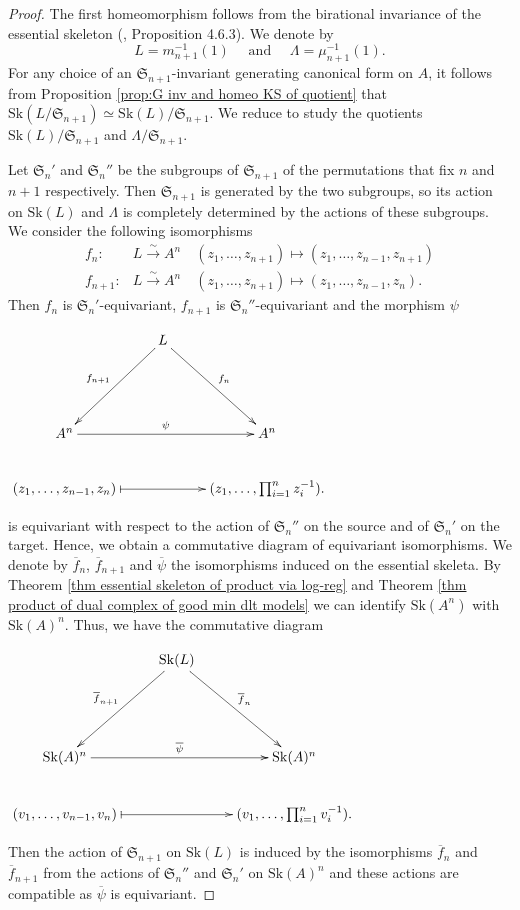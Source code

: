 \documentclass{amsart}%
\numberwithin{equation}{subsection}
\theoremstyle{plain2}
\theoremstyle{definition2}
\theoremstyle{stepstyle}
\theoremstyle{point}
\theoremstyle{subpoint}
\newcommand{\Sk}{\mathrm{Sk}}
\begin{document}
\begin{proof}
The first homeomorphism follows from the birational invariance of the essential skeleton (\cite{MustataNicaise}, Proposition 4.6.3). We denote by $$L=m_{n+1}^{-1}(1) \quad \text{ and }\quad \Lambda=\mu_{n+1}^{-1}(1).$$ For any choice of an $\mathfrak{S}_{n+1}$-invariant generating canonical form on $A$, it follows from Proposition \ref{prop:G inv and homeo KS of quotient} that $\Sk(L/\mathfrak{S}_{n+1}) \simeq \Sk(L)/\mathfrak{S}_{n+1}$. We reduce to study the quotients $\Sk(L)/\mathfrak{S}_{n+1}$ and $\Lambda/\mathfrak{S}_{n+1}$.

Let $\mathfrak{S}_n'$ and $\mathfrak{S}_n''$ be the subgroups of $\mathfrak{S}_{n+1}$ of the permutations that fix $n$ and $n+1$ respectively. Then $\mathfrak{S}_{n+1}$ is generated by the two subgroups, so its action on $\Sk(L)$ and $\Lambda$ is completely determined by the actions of these subgroups. We consider the following isomorphisms 
\begin{align*}
f_n: &L \xrightarrow{\sim} A^n \quad (z_1,\ldots,z_{n+1}) \mapsto (z_1,\ldots,z_{n-1},z_{n+1}) \\
f_{n+1}: &L \xrightarrow{\sim} A^n \quad (z_1,\ldots,z_{n+1}) \mapsto (z_1,\ldots,z_{n-1},z_{n}).
\end{align*} Then $f_n$ is $\mathfrak{S}_n'$-equivariant, $f_{n+1}$ is $\mathfrak{S}_n''$-equivariant and the morphism $\psi$
\begin{center}
\xymatrixrowsep{0.1pc} $\xymatrix{
& L  \ar[ldd]_{f_{n+1}} \ar[ddr]^{f_n} &\\
& & \\
A^n \ar[rr]^{\psi}& & A^n \\
(z_1,\ldots,z_{n-1},z_{n}) \ar@{|->}[rr]& & (z_1,\ldots, \prod_{i=1}^{n} z_i^{-1}).
}$
\end{center} is equivariant with respect to the action of $\mathfrak{S}_n''$ on the source and of $\mathfrak{S}_n'$ on the target. Hence, we obtain a commutative diagram of equivariant isomorphisms. We denote by $\overline{f}_n$, $\overline{f}_{n+1}$ and $\overline{\psi}$ the isomorphisms induced on the essential skeleta. By Theorem \ref{thm essential skeleton of product via log-reg} and Theorem \ref{thm product of dual complex of good min dlt models} we can identify $\Sk(A^n)$ with $\Sk(A)^n$. Thus, we have the commutative diagram
\begin{center}
\xymatrixrowsep{0.1pc} $\xymatrix{
& \Sk(L)  \ar[ldd]_{\overline{f}_{n+1}} \ar[ddr]^{\overline{f}_n} &\\
& & \\
\Sk(A)^n \ar[rr]^{\overline{\psi}}& & \Sk(A)^n \\
(v_1,\ldots,v_{n-1},v_{n}) \ar@{|->}[rr]& & (v_1,\ldots, \prod_{i=1}^{n} v_i^{-1}).
}$
\end{center} Then the action of $\mathfrak{S}_{n+1}$ on $\Sk(L)$ is induced by the isomorphisms $\overline{f}_n$ and $\overline{f}_{n+1}$ from the actions of $\mathfrak{S}_n''$ and $\mathfrak{S}_n'$ on $\Sk(A)^n$ and these actions are compatible as $\overline{\psi}$ is equivariant.


\end{proof}
\end{document}
